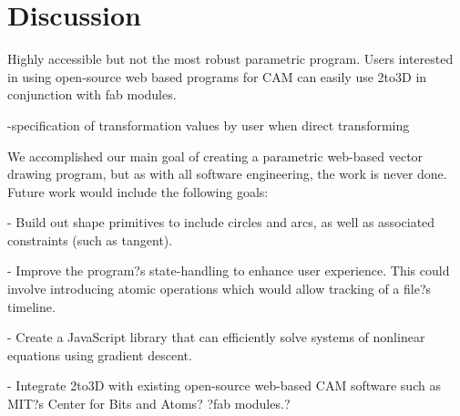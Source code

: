 \section{Discussion}


Highly accessible but not the most robust parametric program. Users interested in using open-source web based programs for CAM can easily use 2to3D in conjunction with fab modules.

-specification of transformation values by user when direct transforming

We accomplished our main goal of creating a parametric web-based vector drawing program, but as with all software engineering, the work is never done. Future work would include the following goals:

- Build out shape primitives to include circles and arcs, as well as associated constraints (such as tangent).

- Improve the program?s state-handling to enhance user experience. This could involve introducing atomic operations which would allow tracking of a file?s timeline.

- Create a JavaScript library that can efficiently solve systems of nonlinear equations using gradient descent.

- Integrate 2to3D with existing open-source web-based CAM software such as MIT?s Center for Bits and Atoms? ?fab modules.?


